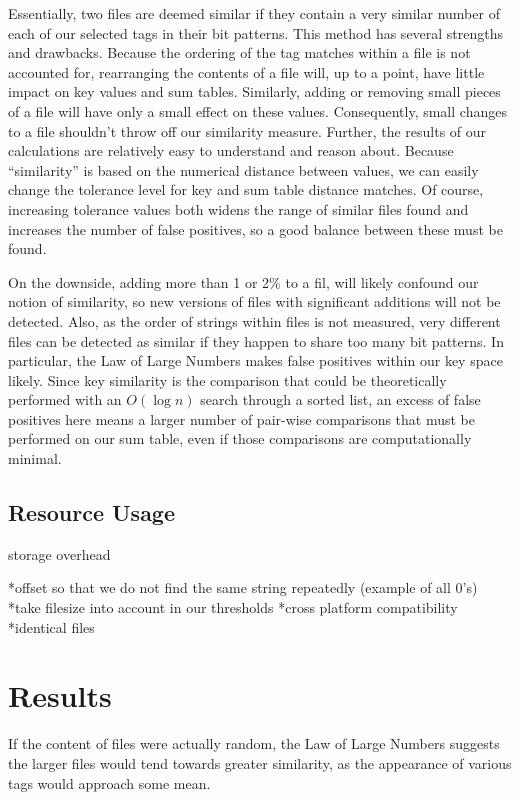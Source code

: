 \documentclass[10pt, twocolumn]{article}
\begin{document}
Essentially, two files are deemed similar if they contain a very similar number of each of our selected tags in their bit patterns.  This method has several strengths and drawbacks.  Because the ordering of the tag matches within a file is not accounted for, rearranging the contents of a file will, up to a point, have little impact on key values and sum tables.  Similarly, adding or removing small pieces of a file will have only a small effect on these values.  Consequently, small changes to a file shouldn't throw off our similarity measure.  Further, the results of our calculations are relatively easy to understand and reason about.  Because ``similarity'' is based on the numerical distance between values, we can easily change the tolerance level for key and sum table distance matches.  Of course, increasing tolerance values both widens the range of similar files found and increases the number of false positives, so a good balance between these must be found.

On the downside, adding more than 1 or 2\% to a fil, will likely confound our notion of similarity, so new versions of files with significant additions will not be detected.  Also, as the order of strings within files is not measured, very different files can be detected as similar if they happen to share too many bit patterns.  In particular, the Law of Large Numbers makes false positives within our key space likely.  Since key similarity is the comparison that could be theoretically performed with an $O(\log n)$ search through a sorted list, an excess of false positives here means a larger number of pair-wise comparisons that must be performed on our sum table, even if those comparisons are computationally minimal.

\subsection{Resource Usage}

storage overhead

*offset so that we do not find the same string repeatedly (example of all 0's) 
*take filesize into account in our thresholds 
*cross platform compatibility
*identical files
\section{Results}

 If the content of files were actually random, the Law of Large Numbers suggests the larger files would tend towards greater similarity, as the appearance of various tags would approach some mean.  
\end{document}
